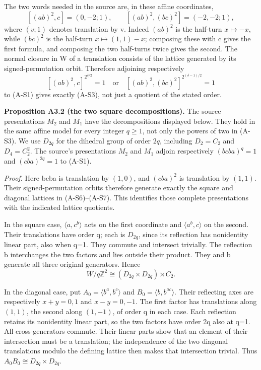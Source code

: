 \documentclass[
  11pt,
  a4paper,
]{article}
\begin{document}
The two words needed in the source are, in these affine coordinates, \[
 [(ab)^2,c]=(0,-2;1),\qquad
 [(ab)^2,(bc)^2]=(-2,-2;1),
 \tag{A-S4}
\] where \((v;1)\) denotes translation by v. Indeed \((ab)^2\) is the
half-turn \(x\mapsto-x\), while \((bc)^2\) is the half-turn
\(x\mapsto(1,1)-x\); composing these with c gives the first formula, and
composing the two half-turns twice gives the second. The normal closure
in W of a translation consists of the lattice generated by its
signed-permutation orbit. Therefore adjoining respectively \[
 [(ab)^2,c]^{2^{\delta/2}}=1
 \quad\text{or}\quad
 [(ab)^2,(bc)^2]^{2^{(\delta-1)/2}}=1
 \tag{A-S5}
\] to (A-S1) gives exactly (A-S3), not just a quotient of the stated
order.

\textbf{Proposition A3.2 (the two square decompositions).} The source
presentations \(M_2\) and \(M_1\) have the decompositions displayed
below. They hold in the same affine model for every integer \(q\ge1\),
not only the powers of two in (A-S3). We use \(D_{2q}\) for the dihedral
group of order \(2q\), including \(D_2=C_2\) and \(D_4=C_2^2\). The
source's presentations \(M_2\) and \(M_1\) adjoin respectively
\((bcba)^q=1\) and \((cba)^{2q}=1\) to (A-S1).

\emph{Proof.} Here bcba is translation by \((1,0)\), and \((cba)^2\) is
translation by \((1,1)\). Their signed-permutation orbits therefore
generate exactly the square and diagonal lattices in (A-S6)--(A-S7).
This identifies those complete presentations with the indicated lattice
quotients.

In the square case, \(\langle a,c^b\rangle\) acts on the first
coordinate and \(\langle a^b,c\rangle\) on the second. Their
translations have order q; each is \(D_{2q}\), since its reflection has
nonidentity linear part, also when q=1. They commute and intersect
trivially. The reflection b interchanges the two factors and lies
outside their product. They and b generate all three original
generators. Hence \[
 W/q\mathbb Z^2\cong(D_{2q}\times D_{2q})\rtimes C_2.
 \tag{A-S6}
\]

In the diagonal case, put \(A_0=\langle b^a,b^c\rangle\) and
\(B_0=\langle b,b^{ac}\rangle\). Their reflecting axes are respectively
\(x+y=0,1\) and \(x-y=0,-1\). The first factor has translations along
\((1,1)\), the second along \((1,-1)\), of order q in each case. Each
reflection retains its nonidentity linear part, so the two factors have
order 2q also at q=1. All cross-generators commute. Their linear parts
show that an element of their intersection must be a translation; the
independence of the two diagonal translations modulo the defining
lattice then makes that intersection trivial. Thus
\(A_0B_0\cong D_{2q}\times D_{2q}\).
\end{document}
